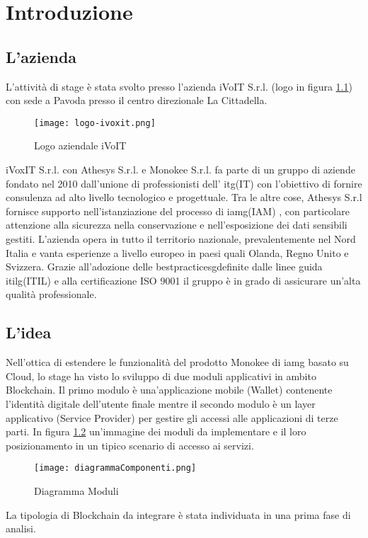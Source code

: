 
\chapter{Introduzione}
\label{cap:introduzione}
\section{L'azienda}

L'attività di stage è stata svolto presso l'azienda iVoIT S.r.l. (logo in figura \ref{fig:Logo-iVoIT}) con sede a Pavoda presso il 
centro direzionale La Cittadella. 
\begin{figure}[!h]
    
    \centering
    \texttt{[image: logo-ivoxit.png]} 
    \caption{Logo aziendale iVoIT}
    \label{fig:Logo-iVoIT} 
\end{figure}
iVoxIT S.r.l. con Athesys S.r.l. e Monokee S.r.l. fa parte di un gruppo di aziende fondato nel 2010 dall’unione di professionisti dell’  \gls{itg}\glsfirstoccur (IT) con l’obiettivo di fornire consulenza ad alto livello tecnologico e progettuale. Tra le altre cose, Athesys S.r.l fornisce supporto
nell’istanziazione del processo di \gls{iamg}\glsfirstoccur (IAM) , con particolare
attenzione alla sicurezza nella conservazione e nell’esposizione dei dati sensibili gestiti.
L’azienda opera in tutto il territorio nazionale, prevalentemente nel Nord Italia e
vanta esperienze a livello europeo in paesi quali Olanda, Regno Unito e Svizzera.
Grazie all’adozione delle \gls{bestpracticesg}\glsfirstoccur definite dalle linee guida \gls{itilg}\glsfirstoccur (ITIL)  e alla certificazione ISO 9001 il gruppo è
in grado di assicurare un’alta qualità professionale.

\section{L'idea}

Nell’ottica di estendere le funzionalità del prodotto Monokee di \gls{iamg} basato su Cloud, lo stage ha visto lo sviluppo di due moduli applicativi in ambito Blockchain.
Il primo modulo è una’applicazione mobile (Wallet) contenente l’identità digitale dell’utente finale mentre il secondo modulo è un layer applicativo (Service Provider) per gestire gli accessi alle applicazioni di terze parti.
In figura \ref{fig:diag-mod} un’immagine dei moduli da implementare e il loro posizionamento in un tipico scenario di accesso ai servizi.
\begin{figure}[!h]
    
    \centering
    \texttt{[image: diagrammaComponenti.png]} 
    \caption{Diagramma Moduli}
    \label{fig:diag-mod} 
\end{figure}
La tipologia di Blockchain da integrare è stata individuata in una prima fase di analisi.

